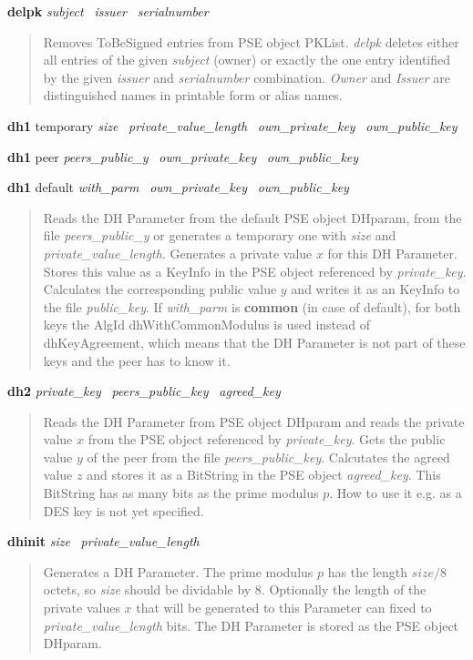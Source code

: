 {\bf delpk} {\em subject}~ {\em issuer}~ {\em serialnumber}
\begin{quote}
Removes ToBeSigned entries from PSE object PKList.
{\em delpk} deletes either all entries of the given {\em subject} (owner) or exactly the one entry identified by 
the
given {\em issuer} and {\em serialnumber} combination. {\em Owner} and {\em Issuer} are distinguished
names in printable form or alias names.
\end{quote}

{\bf dh1} temporary {\em size}~ {\em private\_value\_length}~ {\em own\_private\_key}~ {\em own\_public\_key}

{\bf dh1} peer {\em peers\_public\_y}~ {\em own\_private\_key}~ {\em own\_public\_key}

{\bf dh1} default {\em with\_parm}~ {\em own\_private\_key}~ {\em own\_public\_key}
\begin{quote}
Reads the DH Parameter from the default PSE object DHparam, from the file {\em peers\_public\_y} or generates a temporary one with
{\em size} and {\em private\_value\_length}.
Generates a private value $x$ for this DH Parameter.
Stores this value as a KeyInfo in the PSE object referenced by {\em private\_key}. Calculates the corresponding
public value $y$ and writes it as an KeyInfo to the file  {\em public\_key}.
If {\em with\_parm} is {\bf common} (in case of default), for both keys
the AlgId dhWithCommonModulus is used instead of dhKeyAgreement, which means that the DH Parameter
is not part of these keys and the peer has to know it.
\end{quote}

{\bf dh2} {\em private\_key}~ {\em peers\_public\_key}~ {\em agreed\_key}
\begin{quote}
Reads the DH Parameter from PSE object DHparam and reads the private value $x$ from the
PSE object referenced by {\em private\_key}. Gets the public value $y$ of the peer from the file
{\em peers\_public\_key}. Calcutates the agreed value $z$ and stores it as a BitString in the
PSE object {\em agreed\_key}. This BitString has as many bits as the prime modulus $p$.
How to use it e.g. as a DES key is not yet specified.
\end{quote}

{\bf dhinit} {\em size}~ {\em private\_value\_length}
\begin{quote}
Generates a DH Parameter. The prime modulus $p$ has the length $size/8$ octets,
so {\em size} should be dividable by 8.
Optionally the length of the private values $x$ that will be
generated to this Parameter can fixed to {\em private\_value\_length} bits.
The DH Parameter is stored as the PSE object DHparam.
\end{quote}

